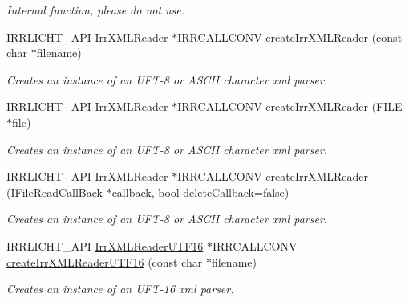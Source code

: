 \begin{DoxyCompactItemize}
\begin{DoxyCompactList}\small\item\em Internal function, please do not use. \end{DoxyCompactList}\item 
I\+R\+R\+L\+I\+C\+H\+T\+\_\+\+A\+PI \hyperlink{namespaceirr_1_1io_a1628edbb9d5d53f18c82d2a92b0ad27e}{Irr\+X\+M\+L\+Reader} $\ast$I\+R\+R\+C\+A\+L\+L\+C\+O\+NV \hyperlink{namespaceirr_1_1io_a581f4d4648398759c61266d63d7106b1}{create\+Irr\+X\+M\+L\+Reader} (const char $\ast$filename)
\begin{DoxyCompactList}\small\item\em Creates an instance of an U\+F\+T-\/8 or A\+S\+C\+II character xml parser. \end{DoxyCompactList}\item 
I\+R\+R\+L\+I\+C\+H\+T\+\_\+\+A\+PI \hyperlink{namespaceirr_1_1io_a1628edbb9d5d53f18c82d2a92b0ad27e}{Irr\+X\+M\+L\+Reader} $\ast$I\+R\+R\+C\+A\+L\+L\+C\+O\+NV \hyperlink{namespaceirr_1_1io_a9c0ebca5a4addfcfd90f51b5131f7d56}{create\+Irr\+X\+M\+L\+Reader} (F\+I\+LE $\ast$file)
\begin{DoxyCompactList}\small\item\em Creates an instance of an U\+F\+T-\/8 or A\+S\+C\+II character xml parser. \end{DoxyCompactList}\item 
I\+R\+R\+L\+I\+C\+H\+T\+\_\+\+A\+PI \hyperlink{namespaceirr_1_1io_a1628edbb9d5d53f18c82d2a92b0ad27e}{Irr\+X\+M\+L\+Reader} $\ast$I\+R\+R\+C\+A\+L\+L\+C\+O\+NV \hyperlink{namespaceirr_1_1io_af853ea962be4432c2d9a50cc7d303fe5}{create\+Irr\+X\+M\+L\+Reader} (\hyperlink{classirr_1_1io_1_1IFileReadCallBack}{I\+File\+Read\+Call\+Back} $\ast$callback, bool delete\+Callback=false)
\begin{DoxyCompactList}\small\item\em Creates an instance of an U\+F\+T-\/8 or A\+S\+C\+II character xml parser. \end{DoxyCompactList}\item 
I\+R\+R\+L\+I\+C\+H\+T\+\_\+\+A\+PI \hyperlink{namespaceirr_1_1io_a5eb4094dfd0d509e0cd8a9d1dd30a5b9}{Irr\+X\+M\+L\+Reader\+U\+T\+F16} $\ast$I\+R\+R\+C\+A\+L\+L\+C\+O\+NV \hyperlink{namespaceirr_1_1io_a86473ef152c15b685af181a4c5461a5d}{create\+Irr\+X\+M\+L\+Reader\+U\+T\+F16} (const char $\ast$filename)
\begin{DoxyCompactList}\small\item\em Creates an instance of an U\+F\+T-\/16 xml parser. \end{DoxyCompactList}\item 

\end{DoxyCompactItemize}
